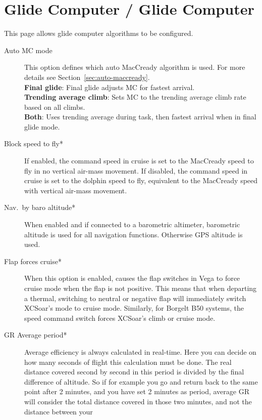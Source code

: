 \section{Glide Computer / Glide Computer}\label{sec:final-glide}\label{conf:final-glide}	

This page allows glide computer algorithms to be configured.

\begin{description}
\item[Auto MC mode]  This option defines which auto MacCready algorithm is used.
  For more details see Section~\ref{sec:auto-maccready}. \\
  {\bf Final glide}: Final glide adjusts MC for fastest arrival.
 \\
  {\bf Trending average climb}: Sets MC to the trending average climb rate based 
  on all climbs. \\
  {\bf Both}: Uses trending average during task, then fastest arrival when in final 
  glide mode.
\item[Block speed to fly*]  If enabled, the command speed in cruise
  is set to the MacCready speed to fly in no vertical air-mass movement.
  If disabled, the command speed in cruise is set to the dolphin speed to fly,
  equivalent to the MacCready speed with vertical air-mass movement.
\item[Nav.\ by baro altitude*]  When enabled and if connected to a barometric
  altimeter, barometric altitude is used for all navigation functions. Otherwise
  GPS altitude is used.
\item[Flap forces cruise*]
  When this option is enabled, causes the flap switches in Vega to
  force cruise mode when the flap is not positive. This means that
  when departing a thermal, switching to neutral or negative flap will
  immediately switch XCSoar's mode to cruise mode.
  Similarly, for Borgelt B50 systems, the speed command switch forces
  XCSoar's climb or cruise mode.
\item[GR Average period*]  Average efficiency is always calculated in real-time. 
  Here you can decide on how many seconds of flight this calculation must be done. 
  The real distance covered second by second in this period is divided by the final 
  difference of altitude.  So if for example you go and return back to the same point 
  after 2 minutes, and you have set 2 minutes as period, average GR will consider the 
  total distance covered in those two minutes, and not the distance between your 

\end{description}
